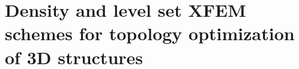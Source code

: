 \chapter{Density and level set XFEM schemes for topology optimization of 3D structures}
\label{sec:density_and_level_set_XFEM_schemes_for_topology_optimization_of_3D_structures}






% 








